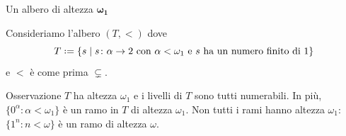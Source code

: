 \documentclass{beamer}
\theoremstyle{num.custom-title}
\theoremstyle{custom-title}
\newcommand*{\defeq}{\mathrel{\rlap{%
                     \raisebox{0.3ex}{$\cdot$}}%
                     \raisebox{-0.3ex}{$\cdot$}}%
                     =}
\begin{document}


\begin{frame}{Un albero di altezza $\pmb{\omega_1}$}


\begin{overprint}
 Consideriamo l'albero $(T,<)$ dove
\[
T \defeq \{s \mid s \colon \alpha \to 2 \text{ con $\alpha < \omega_1$ e $s$ ha un numero finito di 1}\}
\]
e $<$ è come prima $\subsetneq$.


\vspace{-8pt}
\begin{alertblock}{Osservazione}
$T$ ha altezza $\omega_1$ e i livelli di $T$ sono tutti numerabili. In più, $\{0^\alpha : \alpha < \omega_1\}$ è un ramo in $T$ di altezza $\omega_1$. Non tutti i rami hanno altezza $\omega_1$: $\{1^n : n < \omega\}$ è un ramo di altezza $\omega$.
\end{alertblock}
\end{overprint}

\vspace{-20pt}

\end{frame}
\end{document}
